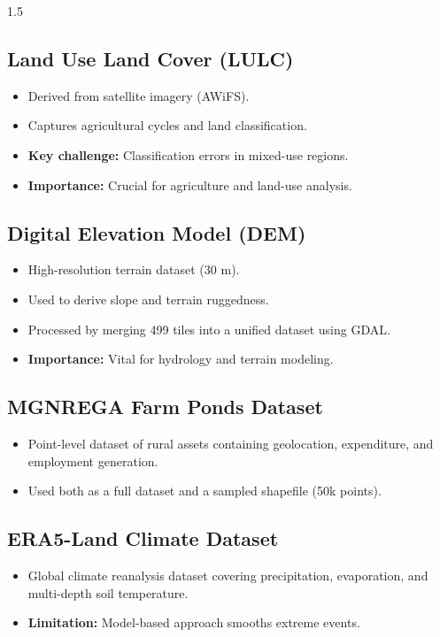 \documentclass[12pt,a4paper]{report}
\begin{document}
\begin{spacing}{1.5}
\subsection{Land Use Land Cover (LULC)}
\begin{itemize}
    \item Derived from satellite imagery (AWiFS).
    \item Captures agricultural cycles and land classification.
    \item \textbf{Key challenge:} Classification errors in mixed-use regions.
    \item \textbf{Importance:} Crucial for agriculture and land-use analysis.
\end{itemize}

\subsection{Digital Elevation Model (DEM)}
\begin{itemize}
    \item High-resolution terrain dataset (30 m).
    \item Used to derive slope and terrain ruggedness.
    \item Processed by merging 499 tiles into a unified dataset using GDAL.
    \item \textbf{Importance:} Vital for hydrology and terrain modeling.
\end{itemize}

\subsection{MGNREGA Farm Ponds Dataset}
\begin{itemize}
    \item Point-level dataset of rural assets containing geolocation, expenditure, and employment generation.
    \item Used both as a full dataset and a sampled shapefile (50k points).
\end{itemize}

\subsection{ERA5-Land Climate Dataset}
\begin{itemize}
    \item Global climate reanalysis dataset covering precipitation, evaporation, and multi-depth soil temperature.
    \item \textbf{Limitation:} Model-based approach smooths extreme events.
\end{itemize}


\end{spacing}
\end{document}
